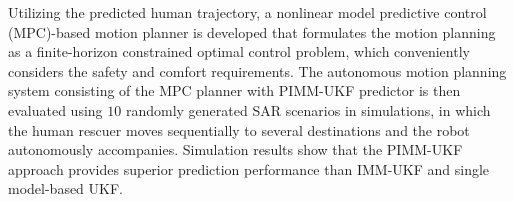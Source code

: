 \documentclass[journal]{IEEEtran}
\DeclareRobustCommand{\clnote}[1]{\ifthenelse{\boolean{include-notes}}%
{\textcolor{orange}{\textbf{CL: #1}}}{}}
\DeclareRobustCommand{\dhnote}[1]{\ifthenelse{\boolean{include-notes}}%
{\textcolor{blue}{\textbf{DH: #1}}}{}}
\begin{document}
    Utilizing the predicted human trajectory, a nonlinear model predictive control \cite{garcia1989model} (MPC)-based motion planner is developed that formulates the motion planning as a finite-horizon constrained optimal control problem, which conveniently considers the safety and comfort requirements.
The autonomous motion planning system consisting of the MPC planner with PIMM-UKF predictor is then evaluated using $10$ randomly generated SAR scenarios in simulations, in which the human rescuer moves sequentially to several destinations and the robot autonomously accompanies.
	Simulation results show that the PIMM-UKF approach provides superior prediction performance than IMM-UKF and single model-based UKF.
\end{document}
